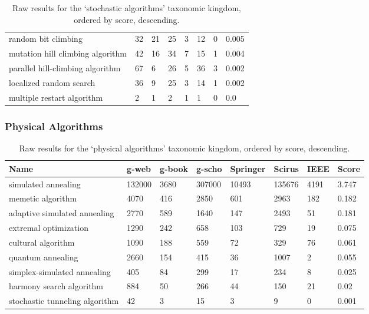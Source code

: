 \documentclass[a4paper, 11pt]{article}
\begin{document}
\begin{table}[ht]
\begin{tabularx}{\textwidth}{Xlllllll}
		random bit climbing & 32 & 21 & 25 & 3 & 12 & 0 & 0.005 \\
		mutation hill climbing algorithm & 42 & 16 & 34 & 7 & 15 & 1 & 0.004 \\
		parallel hill-climbing algorithm & 67 & 6 & 26 & 5 & 36 & 3 & 0.002 \\
		localized random search & 36 & 9 & 25 & 3 & 14 & 1 & 0.002 \\
		multiple restart algorithm & 2 & 1 & 2 & 1 & 1 & 0 & 0.0 \\
		\bottomrule
		\end{tabularx}	
	\caption{Raw results for the `stochastic algorithms' taxonomic kingdom, ordered by score, descending.}
	\label{tab:stochastic}
\end{table}

\subsubsection{Physical Algorithms}

\begin{table}[ht]
	\centering\footnotesize
		\begin{tabularx}{\textwidth}{Xlllllll}
		\toprule
		\textbf{Name} & \textbf{g-web} & \textbf{g-book} & \textbf{g-scho} & \textbf{Springer} & \textbf{Scirus} & \textbf{IEEE} & \textbf{Score} \\ 
		\toprule
		simulated annealing & 132000 & 3680 & 307000 & 10493 & 135676 & 4191 & 3.747 \\ 
		memetic algorithm & 4070 & 416 & 2850 & 601 & 2963 & 182 & 0.182 \\ 
		adaptive simulated annealing & 2770 & 589 & 1640 & 147 & 2493 & 51 & 0.181 \\ 
		extremal optimization & 1290 & 242 & 658 & 103 & 729 & 19 & 0.075 \\ 
		cultural algorithm & 1090 & 188 & 559 & 72 & 329 & 76 & 0.061 \\ 
		quantum annealing & 2660 & 154 & 415 & 36 & 1007 & 2 & 0.055 \\ 
		simplex-simulated annealing & 405 & 84 & 299 & 17 & 234 & 8 & 0.025 \\ 
		harmony search algorithm & 884 & 50 & 266 & 44 & 150 & 21 & 0.02 \\ 
		stochastic tunneling algorithm & 42 & 3 & 15 & 3 & 9 & 0 & 0.001 \\ 
		\bottomrule
		\end{tabularx}	
	\caption{Raw results for the `physical algorithms' taxonomic kingdom, ordered by score, descending.}
	\label{tab:physical}
\end{table}
\end{document}
